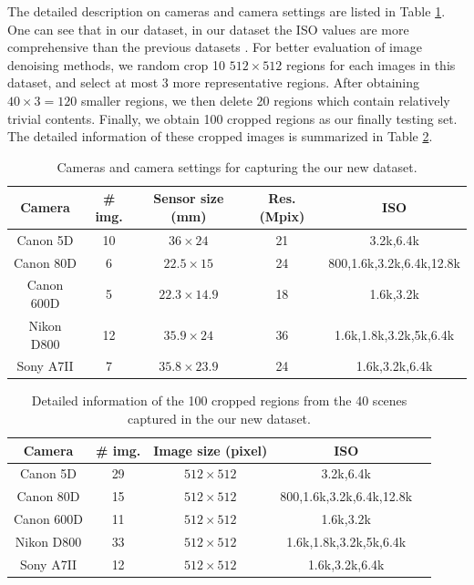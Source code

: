 The detailed description on cameras and camera settings are listed in Table \ref{tab6-4}. One can see that in our dataset, in our dataset the ISO values are more comprehensive than the previous datasets \cite{RENOIR2014,crosschannel2016,dnd2017}. For better evaluation of image denoising methods, we random crop 10 $512\times512$ regions for each images in this dataset, and select at most 3 more representative regions. After obtaining $40\times3=120$ smaller regions, we then delete 20 regions which contain relatively trivial contents. Finally, we obtain 100 cropped regions as our finally testing set. The detailed information of these cropped images is summarized in Table \ref{tab6-5}.

\begin{table}[ht!]
\caption{Cameras and camera settings for capturing the our new dataset.}

\label{tab6-4}
\begin{center}
\small
\renewcommand\arraystretch{1.2}
\begin{tabular*}{1\textwidth}{@{\extracolsep{\fill}}ccccc}
\hline
Camera
&
\# img.
&
Sensor size (mm)
&
Res. (Mpix)
&
ISO
\\
\hline
Canon 5D & 10  & $36\times24$  & 21  & 3.2k,6.4k
\\
\hline
Canon 80D & 6  & $22.5\times15$  & 24 & 800,1.6k,3.2k,6.4k,12.8k 
\\
\hline   
Canon 600D & 5 & $22.3\times14.9$  & 18  & 1.6k,3.2k 
\\
\hline   
Nikon D800 & 12 & $35.9\times24$  & 36 & 1.6k,1.8k,3.2k,5k,6.4k 
\\
\hline   
Sony A7II & 7 & $35.8\times23.9$  & 24  & 1.6k,3.2k,6.4k 
\\
\hline
\end{tabular*}
\end{center}
\end{table}

\begin{table}[ht!]
\caption{Detailed information of the 100 cropped regions from the 40 scenes captured in the our new dataset.}

\label{tab6-5}
\begin{center}
\small
\renewcommand\arraystretch{1.2}
\begin{tabular*}{1\textwidth}{@{\extracolsep{\fill}}ccccc}
\hline
Camera
&
\# img.
&
Image size (pixel)
&
ISO
\\
\hline
Canon 5D & 29 & $512\times512$ & 3.2k,6.4k
\\
\hline
Canon 80D & 15 & $512\times512$ & 800,1.6k,3.2k,6.4k,12.8k 
\\
\hline   
Canon 600D & 11 & $512\times512$ & 1.6k,3.2k 
\\
\hline   
Nikon D800 & 33 & $512\times512$ & 1.6k,1.8k,3.2k,5k,6.4k 
\\
\hline   
Sony A7II & 12 & $512\times512$ & 1.6k,3.2k,6.4k 
\\
\hline
\end{tabular*}
\end{center}
\end{table}


